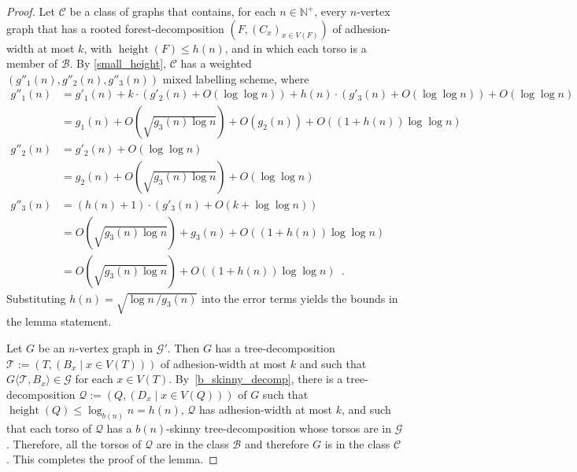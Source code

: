 \documentclass[twoside,leqno]{article}
\newcommand{\N}{\mathbb{N}}
\renewcommand{\le}{\leqslant}
\renewcommand{\leq}{\leqslant}
\newcommand{\torso}[2]{{#1}\langle{#2}\rangle}
\DeclareMathOperator{\height}{height}
\newcommand{\Oh}{O}
\begin{document}
\begin{proof}
  Let $\mathcal{C}$ be a class of graphs that contains, for each $n\in\N^+$,
  every $n$-vertex graph that has a rooted forest-decomposition $(F,(C_x)_{x\in V(F)})$
  of adhesion-width at most $k$, with $\height(F)\leq h(n)$, and
  in which each torso is a member of $\mathcal{B}$.
  By \cref{small_height}, $\mathcal{C}$ has a weighted \linebreak $(g''_1(n),g''_2(n),g''_3(n))$ mixed labelling scheme, where
  \begin{align*}
    g''_1(n)
     & = g'_1(n) + k\cdot(g'_2(n) + \Oh(\log\log n)) + h(n)\cdot (g'_3(n)+\Oh(\log\log n)) + \Oh(\log\log n) \\
     & = g_1(n) +  \Oh\left(\sqrt{g_3(n) \log n}\right) + \Oh(g_2(n)) + \Oh\left((1+h(n))\log\log n\right)   \\
    g''_2(n)
     & = g'_2(n) + \Oh(\log\log n)                                                                           \\
     & = g_2(n) + \Oh\left(\sqrt{{g_3(n)\log n}}\right) + \Oh(\log\log n)                                    \\
    g''_3(n)
     & = (h(n)+1)\cdot (g'_3(n)+\Oh(k+\log\log n))                                                           \\%
     & = \Oh\left(\sqrt{g_3(n)\log n}\right) + g_3(n) + \Oh\left((1+h(n))\log\log n\right)                   \\
     & = \Oh\left(\sqrt{g_3(n) \log n}\right) + \Oh\left((1+h(n))\log\log n\right)\enspace.
  \end{align*}
  Substituting $h(n) = \sqrt{\log n\, / g_3(n)}$ into the error terms yields the bounds in the lemma statement.

  Let $G$ be an $n$-vertex graph in $\mathcal{G}'$.
  Then $G$ has a tree-decomposition $\mathcal{T}:=(T,(B_x\mid x\in V(T)))$ of adhesion-width at most $k$ and such that $\torso{G}{\mathcal{T},B_x}\in\mathcal{G}$ for each $x\in V(T)$.
  By~\cref{b_skinny_decomp}, there is a tree-decomposition $\mathcal{Q}:=(Q,(D_x \mid x\in V(Q)))$ of $G$ such that $\height(Q)\le\log_{b(n)} n = h(n)$, $\mathcal{Q}$ has adhesion-width at most $k$, and such that each torso of $\mathcal{Q}$ has a $b(n)$-skinny tree-decomposition whose torsos are in $\mathcal{G}$.
  Therefore, all the torsos of $\mathcal{Q}$ are in the class $\mathcal{B}$ and therefore $G$ is in the class $\mathcal{C}$.  This completes the proof of the lemma.
\end{proof}
\end{document}
